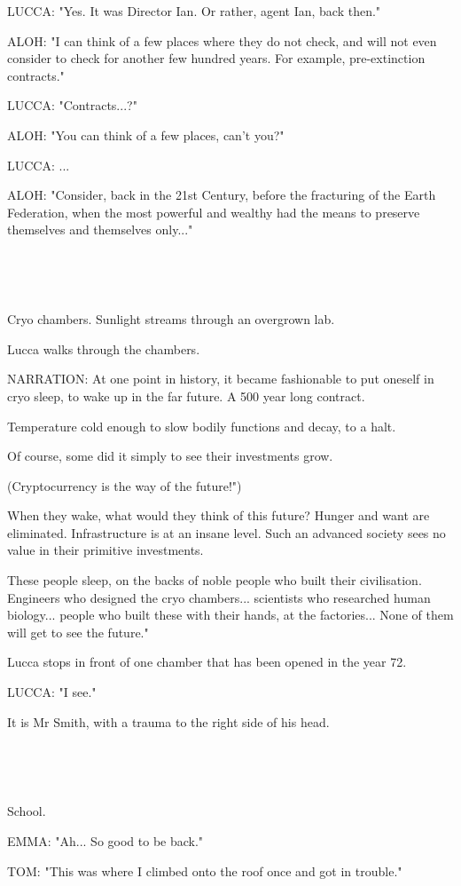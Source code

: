\documentclass[11pt]{article}
\begin{document}
LUCCA: "Yes. It was Director Ian.
Or rather, agent Ian, back then."

ALOH: "I can think of a few places where they do not check, and will not even consider to check for another few hundred years. 
For example, pre-extinction contracts."

LUCCA: "Contracts...?"

ALOH: "You can think of a few places, can't you?"

LUCCA: ...

ALOH: "Consider, back in the 21st Century, before the fracturing of the Earth Federation, when the most powerful and wealthy had the means to preserve themselves and themselves only..."

\ 

\ 

Cryo chambers. 
Sunlight streams through an overgrown lab. 

Lucca walks through the chambers.

NARRATION: At one point in history, it became fashionable to put oneself in cryo sleep, to wake up in the far future. 
A 500 year long contract.

Temperature cold enough to slow bodily functions and decay, to a halt.

Of course, some did it simply to see their investments grow.

(Cryptocurrency is the way of the future!")

When they wake, what would they think of this future?
Hunger and want are eliminated.
Infrastructure is at an insane level.
Such an advanced society sees no value in their primitive investments.

These people sleep, on the backs of noble people who built their civilisation.
Engineers who designed the cryo chambers... scientists who researched human biology... people who built these with their hands, at the factories... None of them will get to see the future."

Lucca stops in front of one chamber that has been opened in the year 72.

LUCCA: "I see."

It is Mr Smith, with a trauma to the right side of his head.

\ 

\ 

School.

EMMA: "Ah... So good to be back."

TOM: "This was where I climbed onto the roof once and got in trouble."
\end{document}
